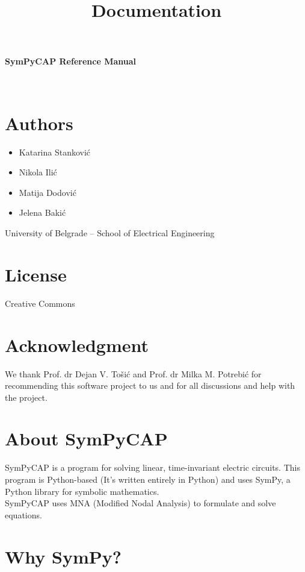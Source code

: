 \documentclass[11pt]{article}
\title{Documentation}
\providecommand{\tightlist}{%
      \setlength{\itemsep}{0pt}\setlength{\parskip}{0pt}}
\begin{document}
    
    
    

    
 \hypertarget{documentation-for-sympycap}{%
\textbf{\Huge SymPyCAP Reference Manual}\label{documentation-for-sympycap}}\\[3ex]

\hypertarget{author}{%
\section{Authors}\label{author}}

\begin{itemize}
\tightlist
\item
  Katarina Stanković
\item
  Nikola Ilić
\item
  Matija Dodović
\item
  Jelena Bakić
\end{itemize}

University of Belgrade \textrm{--} School of Electrical Engineering

\hypertarget{license}{%
\section{License}\label{license}}

Creative Commons

\hypertarget{acknowledgment}{%
\section{Acknowledgment}\label{acknowledgment}}

We thank Prof. dr Dejan V. Tošić and Prof. dr Milka M. Potrebić for recommending this software project
to us and for all discussions and help with the project.

\hypertarget{about-sympycap}{%
\section{About SymPyCAP}\label{about-sympycap}}

SymPyCAP is a program for solving linear, time-invariant electric
circuits. This program is Python-based (It's written entirely in Python)
and uses SymPy, a Python library for symbolic mathematics.\\
SymPyCAP uses MNA (Modified Nodal Analysis) to formulate and solve
equations.

\hypertarget{why-sympy}{%
\section{Why SymPy?}\label{why-sympy}}
\end{document}
